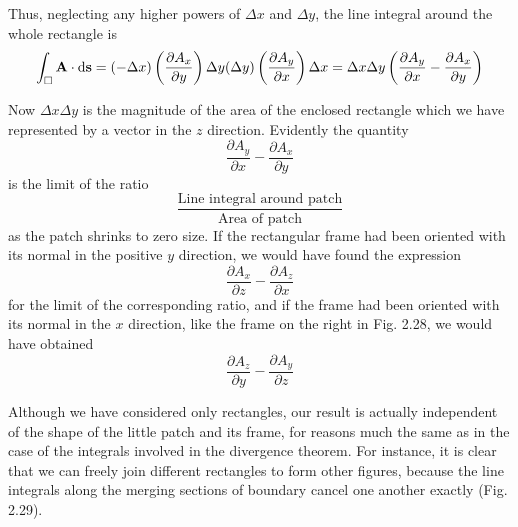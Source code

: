 
Thus, neglecting any higher powers of $\Delta x$ and $\Delta y$, the line integral
around the whole rectangle is
\begin{equation}
  \int_\Box \mathbf{A}\cdot\operatorname{d\!}\mathbf{s} = (-\Delta x)\left(\frac{\partial A_x}{\partial y}\right)\Delta y
                (\Delta y)\left(\frac{\partial A_y}{\partial x}\right)\Delta x
    = \Delta x \Delta y\left(\frac{\partial A_y}{\partial x}-\frac{\partial A_x}{\partial y}\right)
\end{equation}

Now $\Delta x \Delta y$ is the magnitude of the area of the enclosed rectangle
which we have represented by a vector in the $z$ direction. Evidently
the quantity
\begin{equation}
  \frac{\partial A_y}{\partial x}-\frac{\partial A_x}{\partial y}
\end{equation}
is the limit of the ratio
\begin{equation}
  \frac{\text{Line integral around patch}}{\text{Area of patch}}
\end{equation}
as the patch shrinks to zero size. If the rectangular frame had been
oriented with its normal in the positive $y$ direction, we would have
found the expression
\begin{equation}
  \frac{\partial A_x}{\partial z}-\frac{\partial A_z}{\partial x}
\end{equation}
for the limit of the corresponding ratio, and if the frame had been
oriented with its normal in the $x$ direction, like the frame on the right
in Fig. 2.28, we would have obtained
\begin{equation}
  \frac{\partial A_z}{\partial y}-\frac{\partial A_y}{\partial z}
\end{equation}

Although we have considered only rectangles, our result is actually
independent of the shape of the little patch and its frame, for reasons
much the same as in the case of the integrals involved in the divergence
theorem. For instance, it is clear that we can freely join different
rectangles to form other figures, because the line integrals
along the merging sections of boundary cancel one another exactly
(Fig. 2.29).

